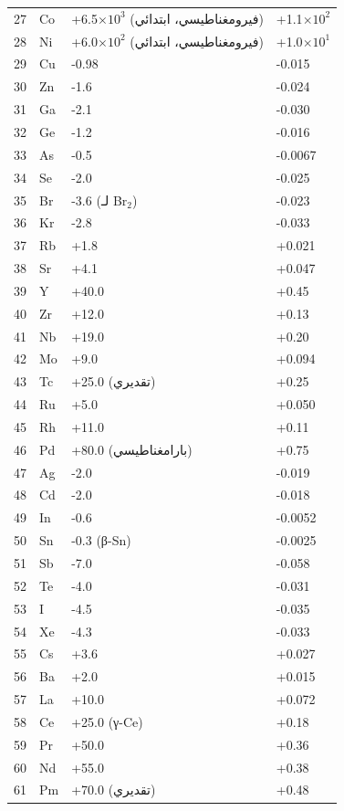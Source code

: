 \documentclass[11pt,a4paper]{article}
\begin{document}
\begin{otherlanguage}{arabic}
\begin{longtable}{p{0.6cm}p{1.2cm}p{2.5cm}p{2.5cm}}
			27 & Co & +6.5\(\times10^3\) (فيرومغناطيسي، ابتدائي) & +1.1\(\times10^2\) \\
			28 & Ni & +6.0\(\times10^2\) (فيرومغناطيسي، ابتدائي) & +1.0\(\times10^1\) \\
			29 & Cu & -0.98 & -0.015 \\
			30 & Zn & -1.6 & -0.024 \\
			31 & Ga & -2.1 & -0.030 \\
			32 & Ge & -1.2 & -0.016 \\
			33 & As & -0.5 & -0.0067 \\
			34 & Se & -2.0 & -0.025 \\
			35 & Br & -3.6 (لـ Br\(_2\)) & -0.023 \\
			36 & Kr & -2.8 & -0.033 \\
			37 & Rb & +1.8 & +0.021 \\
			38 & Sr & +4.1 & +0.047 \\
			39 & Y  & +40.0 & +0.45 \\
			40 & Zr & +12.0 & +0.13 \\
			41 & Nb & +19.0 & +0.20 \\
			42 & Mo & +9.0 & +0.094 \\
			43 & Tc & +25.0 (تقديري) & +0.25 \\
			44 & Ru & +5.0 & +0.050 \\
			45 & Rh & +11.0 & +0.11 \\
			46 & Pd & +80.0 (بارامغناطيسي) & +0.75 \\
			47 & Ag & -2.0 & -0.019 \\
			48 & Cd & -2.0 & -0.018 \\
			49 & In & -0.6 & -0.0052 \\
			50 & Sn & -0.3 (β-Sn) & -0.0025 \\
			51 & Sb & -7.0 & -0.058 \\
			52 & Te & -4.0 & -0.031 \\
			53 & I  & -4.5 & -0.035 \\
			54 & Xe & -4.3 & -0.033 \\
			55 & Cs & +3.6 & +0.027 \\
			56 & Ba & +2.0 & +0.015 \\
			57 & La & +10.0 & +0.072 \\
			58 & Ce & +25.0 (γ-Ce) & +0.18 \\
			59 & Pr & +50.0 & +0.36 \\
			60 & Nd & +55.0 & +0.38 \\
			61 & Pm & +70.0 (تقديري) & +0.48 \\

\end{longtable}
\end{otherlanguage}
\end{document}
